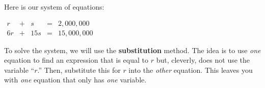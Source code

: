 \documentclass[nooutcomes]{ximera}
\begin{document}
\begin{example}
        Here is our system of equations:
\begin{center}
  $
          \begin{array}{ccccc}
          r&+& s&=&2{,}000{,}000 \\
          6r&+& 15s&=&15{,}000{,}000
          \end{array}
$
       \end{center}
        To solve the system, we will use the
        \textbf{substitution} method.
        The idea is to use \textit{one}
        equation to find an expression that is equal to $r$ but,
        cleverly, does not use the variable ``$r$.'' Then,
        substitute this for $r$ into the
        \textit{other} equation.
        This leaves you with \textit{one}
        equation that only has \textit{one} variable.


\end{example}
\end{document}
